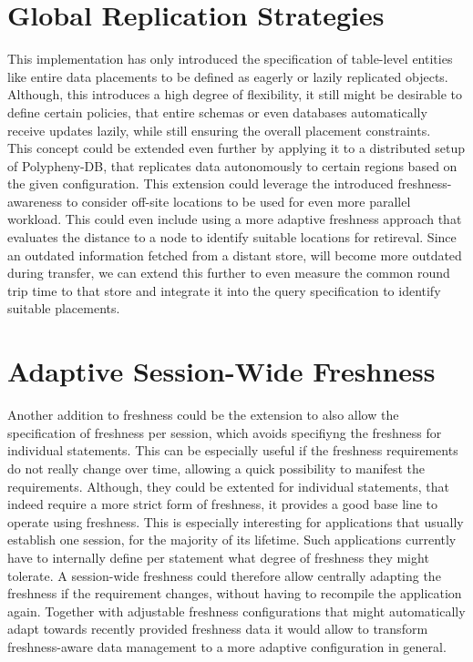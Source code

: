\tocless\section{Global Replication Strategies}
This implementation has only introduced the specification of table-level entities like entire data placements to be defined as eagerly or lazily replicated objects.
Although, this introduces a high degree of flexibility, it still might be desirable to define certain policies, that entire schemas or even databases automatically 
receive updates lazily, while still ensuring the overall placement constraints.\\
This concept could be extended even further by applying it to a distributed setup of Polypheny-DB, that replicates data autonomously to certain regions based on the given 
configuration. 
This extension could leverage the introduced freshness-awareness to consider off-site locations to be used for even more parallel workload.
This could even include using a more adaptive freshness approach that evaluates the distance to a node to identify suitable locations for retireval.
Since an outdated information fetched from a distant store, will become more outdated during transfer, we can
extend this further to even measure the common round trip time to that store and integrate it into the query specification to identify suitable placements.\\

 





\tocless\section{Adaptive Session-Wide Freshness}
Another addition to freshness could be the extension to also allow the specification
of freshness per session, which avoids specifiyng the freshness for individual statements.
This can be especially useful if the freshness requirements do not really change over time, allowing a quick
possibility to manifest the requirements. Although, they could be extented for individual statements,
that indeed require a more strict form of freshness, it provides a good base line to operate using freshness.
This is especially interesting for applications that usually establish one session, for the majority of its lifetime. 
Such applications currently have to internally define per statement what degree of freshness they might tolerate. 
A session-wide freshness could therefore allow centrally adapting the freshness if the requirement changes, without having to recompile the application again.
Together with adjustable freshness configurations that might automatically adapt towards recently provided freshness data it would allow
to transform freshness-aware data management to a more adaptive configuration in general.



